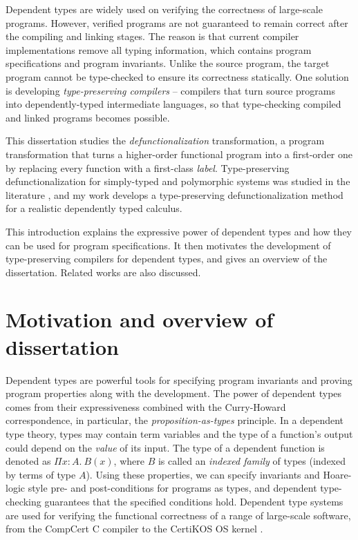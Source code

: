 
Dependent types are widely used on verifying the correctness of large-scale programs. However, verified programs are not guaranteed to remain correct after the compiling and linking stages. The reason is that current compiler implementations remove all typing information, which contains program specifications and program invariants. Unlike the source program, the target program cannot be type-checked to ensure its correctness statically. One solution is developing \textit{type-preserving compilers} – compilers that turn source programs into dependently-typed intermediate languages, so that type-checking compiled and linked programs becomes possible.

This dissertation studies the \textit{defunctionalization} transformation, a program transformation that turns a higher-order functional program into a first-order one by replacing every function with a first-class \textit{label}. Type-preserving defunctionalization for simply-typed and polymorphic systems was studied in the literature \cite{reynolds1972definitional,pottier2004polymorphic}, and my work develops a type-preserving defunctionalization method for a realistic dependently typed calculus.

This introduction explains the expressive power of dependent types and how they can be used for program specifications. It then motivates the development of type-preserving compilers for dependent types, and gives an overview of the dissertation. Related works are also discussed.

\section{Motivation and overview of dissertation}

Dependent types are powerful tools for specifying program invariants and proving program properties along with the development. The power of dependent types comes from their expressiveness combined with the Curry-Howard correspondence, in particular, the \textit{proposition-as-types} principle. In a dependent type theory, types may contain term variables and the type of a function’s output could depend on the \textit{value} of its input. The type of a dependent function is denoted as $\Pi x:A.\ B(x)$, where $B$ is called an \textit{indexed family} of types (indexed by terms of type $A$). Using these properties, we can specify invariants and Hoare-logic style pre- and post-conditions for programs as types, and dependent type-checking guarantees that the specified conditions hold. Dependent type systems are used for verifying the functional correctness of a range of large-scale software, from the CompCert C compiler \cite{leroy2006formal} to the CertiKOS OS kernel \cite{gu2015deep}.

